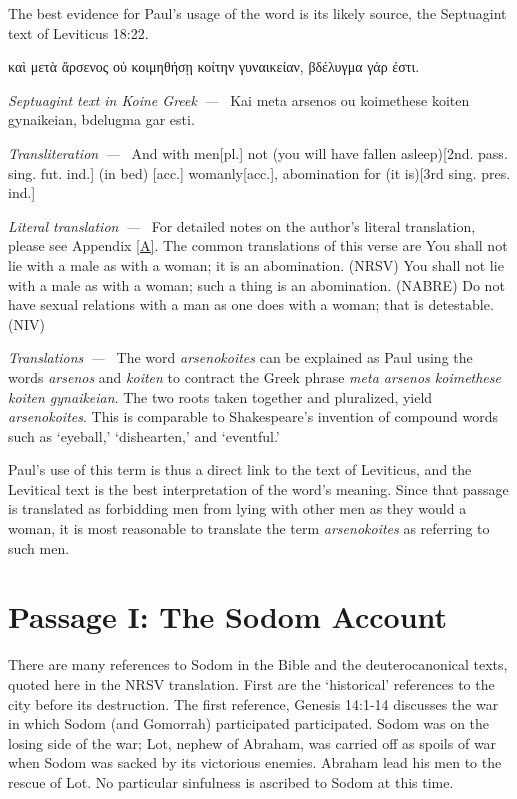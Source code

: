 \documentclass[10pt]{article}
\let\oldquote\quote
\let\endoldquote\endquote
\renewenvironment{quote}[2][]
  {\if\relax\detokenize{#1}\relax
     \def\quoteauthor{#2}%
   \else
     \def\quoteauthor{#2~---~#1}%
   \fi
   \oldquote}
  {\par\nobreak\smallskip\hfill\textit{\quoteauthor}%
   \endoldquote\addvspace{\bigskipamount}}
\begin{document}
The best evidence for Paul's usage of the word is its likely source, the Septuagint text of Leviticus 18:22.

\begin{quote}{Septuagint text in Koine Greek}
καὶ μετὰ ἄρσενος οὐ κοιμηθήσῃ κοίτην γυναικείαν, βδέλυγμα γάρ ἐστι. 
\end{quote}
\begin{quote}{Transliteration}
Kai meta arsenos ou koimethese koiten gynaikeian, bdelugma gar esti.
\end{quote}
\begin{quote}{Literal translation}
And with men[pl.] not (you will have fallen asleep)[2nd. pass. sing. fut. ind.] (in bed) [acc.] womanly[acc.], abomination for (it is)[3rd sing. pres. ind.]
\end{quote}
For detailed notes on the author's literal translation, please see Appendix \ref{A}. The common translations of this verse are
\begin{quote}{Translations}
You shall not lie with a male as with a woman; it is an abomination. (NRSV)\linebreak
You shall not lie with a male as with a woman; such a thing is an abomination. (NABRE)\linebreak
Do not have sexual relations with a man as one does with a woman; that is detestable. (NIV)\linebreak
\end{quote}
The word \textit{arsenokoites} can be explained as Paul using the words \textit{arsenos}  and \textit{koiten} to contract the Greek phrase \textit{meta arsenos koimethese koiten gynaikeian}. The two roots taken together and pluralized, yield \textit{arsenokoites}. This is comparable to Shakespeare's invention of compound words such as `eyeball,' `dishearten,' and `eventful.'

Paul's use of this term is thus a direct link to the text of Leviticus, and the Levitical text is the best interpretation of the word's meaning. Since that passage is translated as forbidding men from lying with other men as they would a woman, it is most reasonable to translate the term \textit{arsenokoites} as referring to such men. 

\section*{Passage I: The Sodom Account}

There are many references to Sodom in the Bible and the deuterocanonical texts, quoted here in the NRSV translation. First are the `historical' references to the city before its destruction. The first reference, Genesis 14:1-14 discusses the war in which Sodom (and Gomorrah) participated participated. Sodom was on the losing side of the war; Lot, nephew of Abraham, was carried off as spoils of war when Sodom was sacked by its victorious enemies. Abraham lead his men to the rescue of Lot. No particular sinfulness is ascribed to Sodom at this time. 
\end{document}
